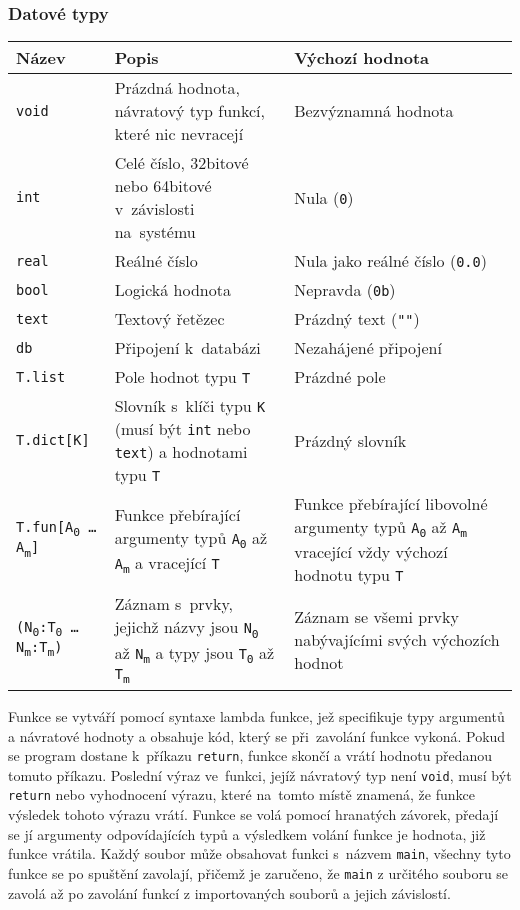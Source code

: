 \documentclass[a4paper,12pt]{article}
\def\quote #1{"#1"}
\begin{document}
\subsubsection{Datové typy}
\begin{tabular}{|m{3.5cm} m{6cm} m{5cm}|}\hline
Název & Popis & Výchozí hodnota \\\hline
\texttt{void} & Prázdná hodnota, návratový typ funkcí, které nic nevracejí & Bezvýznamná hodnota\\\hline
\texttt{int} & Celé číslo, 32bitové nebo 64bitové v~závislosti na~systému & Nula (\texttt{0})\\\hline
\texttt{real} & Reálné číslo & Nula jako reálné číslo (\texttt{0.0})\\\hline
\texttt{bool} & Logická hodnota & Nepravda (\texttt{0b})\\\hline
\texttt{text} & Textový řetězec & Prázdný text (\texttt{\quote{}})\\\hline
\texttt{db} & Připojení k~databázi & Nezahájené připojení\\\hline
\texttt{T.list} & Pole hodnot typu \texttt{T} & Prázdné pole\\\hline
\texttt{T.dict[K]} & Slovník s~klíči typu \texttt{K} (musí být \texttt{int} nebo \texttt{text}) a hodnotami typu \texttt{T} & Prázdný slovník\\\hline
\texttt{T.fun[A\textsubscript{0} \ldots{} A\textsubscript{m}]} & Funkce přebírající argumenty typů \texttt{A\textsubscript{0}} až \texttt{A\textsubscript{m}} a vracející \texttt{T} & Funkce přebírající libovolné argumenty typů \texttt{A\textsubscript{0}} až \texttt{A\textsubscript{m}} vracející vždy výchozí hodnotu typu \texttt{T}\\\hline
\texttt{(N\textsubscript{0}:T\textsubscript{0} \ldots{} N\textsubscript{m}:T\textsubscript{m})} & Záznam s~prvky, jejichž názvy jsou \texttt{N\textsubscript{0}} až \texttt{N\textsubscript{m}} a typy jsou \texttt{T\textsubscript{0}} až \texttt{T\textsubscript{m}} & Záznam se všemi prvky nabývajícími svých výchozích hodnot\\\hline
\end{tabular}

Funkce se vytváří pomocí syntaxe lambda funkce, jež specifikuje typy argumentů a návratové hodnoty a obsahuje kód, který se při~zavolání funkce vykoná. Pokud se program dostane k~příkazu \texttt{return}, funkce skončí a vrátí hodnotu předanou tomuto příkazu. Poslední výraz ve~funkci, jejíž návratový typ není \texttt{void}, musí být \texttt{return} nebo vyhodnocení výrazu, které na~tomto místě znamená, že funkce výsledek tohoto výrazu vrátí. Funkce se volá pomocí hranatých závorek, předají se jí argumenty odpovídajících typů a výsledkem volání funkce je hodnota, již funkce vrátila. Každý soubor může obsahovat funkci s~názvem \texttt{main}, všechny tyto funkce se po spuštění zavolají, přičemž je zaručeno, že \texttt{main} z určitého souboru se zavolá až po zavolání funkcí z importovaných souborů a jejich závislostí.
\end{document}
